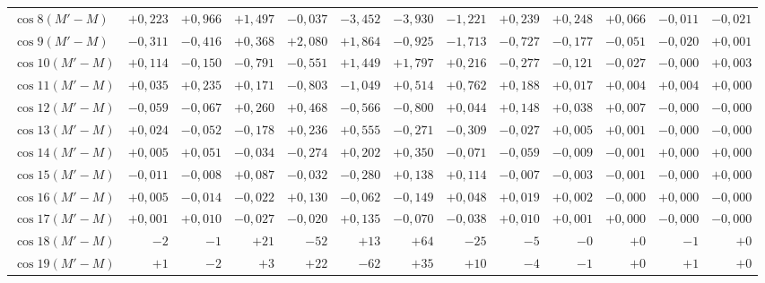 \begin{landscape}
\begin{longtable}{@{}l|r|r|r|r|r|r|r|r|r|r|r|r@{}}
\(\cos 8(M'-M)\) & \(+0{,}223\) & \(+0{,}966\) & \(+1{,}497\) & \(-0{,}037\) & \(-3{,}452\) & \(-3{,}930\) & \(-1{,}221\) & \(+0{,}239\) & \(+0{,}248\) & \(+0{,}066\) & \(-0{,}011\) & \(-0{,}021\)\\
\(\cos 9(M'-M)\) & \(-0{,}311\) & \(-0{,}416\) & \(+0{,}368\) & \(+2{,}080\) & \(+1{,}864\) & \(-0{,}925\) & \(-1{,}713\) & \(-0{,}727\) & \(-0{,}177\) & \(-0{,}051\) & \(-0{,}020\) & \(+0{,}001\)\\
\(\cos 10(M'-M)\) & \(+0{,}114\) & \(-0{,}150\) & \(-0{,}791\) & \(-0{,}551\) & \(+1{,}449\) & \(+1{,}797\) & \(+0{,}216\) & \(-0{,}277\) & \(-0{,}121\) & \(-0{,}027\) & \(-0{,}000\) & \(+0{,}003\)\\
\(\cos 11(M'-M)\) & \(+0{,}035\) & \(+0{,}235\) & \(+0{,}171\) & \(-0{,}803\) & \(-1{,}049\) & \(+0{,}514\) & \(+0{,}762\) & \(+0{,}188\) & \(+0{,}017\) & \(+0{,}004\) & \(+0{,}004\) & \(+0{,}000\)\\
\(\cos 12(M'-M)\) & \(-0{,}059\) & \(-0{,}067\) & \(+0{,}260\) & \(+0{,}468\) & \(-0{,}566\) & \(-0{,}800\) & \(+0{,}044\) & \(+0{,}148\) & \(+0{,}038\) & \(+0{,}007\) & \(-0{,}000\) & \(-0{,}000\)\\
\(\cos 13(M'-M)\) & \(+0{,}024\) & \(-0{,}052\) & \(-0{,}178\) & \(+0{,}236\) & \(+0{,}555\) & \(-0{,}271\) & \(-0{,}309\) & \(-0{,}027\) & \(+0{,}005\) & \(+0{,}001\) & \(-0{,}000\) & \(-0{,}000\)\\
\(\cos 14(M'-M)\) & \(+0{,}005\) & \(+0{,}051\) & \(-0{,}034\) & \(-0{,}274\) & \(+0{,}202\) & \(+0{,}350\) & \(-0{,}071\) & \(-0{,}059\) & \(-0{,}009\) & \(-0{,}001\) & \(+0{,}000\) & \(+0{,}000\)\\
\(\cos 15(M'-M)\) & \(-0{,}011\) & \(-0{,}008\) & \(+0{,}087\) & \(-0{,}032\) & \(-0{,}280\) & \(+0{,}138\) & \(+0{,}114\) & \(-0{,}007\) & \(-0{,}003\) & \(-0{,}001\) & \(-0{,}000\) & \(+0{,}000\)\\
\(\cos 16(M'-M)\) & \(+0{,}005\) & \(-0{,}014\) & \(-0{,}022\) & \(+0{,}130\) & \(-0{,}062\) & \(-0{,}149\) & \(+0{,}048\) & \(+0{,}019\) & \(+0{,}002\) & \(-0{,}000\) & \(+0{,}000\) & \(-0{,}000\)\\
\(\cos 17(M'-M)\) & \(+0{,}001\) & \(+0{,}010\) & \(-0{,}027\) & \(-0{,}020\) & \(+0{,}135\) & \(-0{,}070\) & \(-0{,}038\) & \(+0{,}010\) & \(+0{,}001\) & \(+0{,}000\) & \(-0{,}000\) & \(-0{,}000\)\\
\(\cos 18(M'-M)\) & \(-2\) & \(-1\) & \(+21\) & \(-52\) & \(+13\) & \(+64\) & \(-25\) & \(-5\) & \(-0\) & \(+0\) & \(-1\) & \(+0\)\\
\(\cos 19(M'-M)\) & \(+1\) & \(-2\) & \(+3\) & \(+22\) & \(-62\) & \(+35\) & \(+10\) & \(-4\) & \(-1\) & \(+0\) & \(+1\) & \(+0\)\\

\end{longtable}
\end{landscape}
